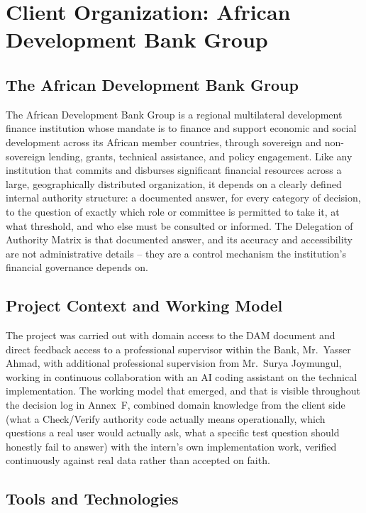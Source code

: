 \chapter{Client Organization: African Development Bank Group}
\label{ch:client}

\section{The African Development Bank Group}

The African Development Bank Group is a regional multilateral development finance institution whose mandate is to finance and support economic and social development across its African member countries, through sovereign and non-sovereign lending, grants, technical assistance, and policy engagement. Like any institution that commits and disburses significant financial resources across a large, geographically distributed organization, it depends on a clearly defined internal authority structure: a documented answer, for every category of decision, to the question of exactly which role or committee is permitted to take it, at what threshold, and who else must be consulted or informed. The Delegation of Authority Matrix is that documented answer, and its accuracy and accessibility are not administrative details -- they are a control mechanism the institution's financial governance depends on.

\section{Project Context and Working Model}

The project was carried out with domain access to the DAM document and direct feedback access to a professional supervisor within the Bank, Mr.~Yasser Ahmad, with additional professional supervision from Mr.~Surya Joymungul, working in continuous collaboration with an AI coding assistant on the technical implementation. The working model that emerged, and that is visible throughout the decision log in Annex~F, combined domain knowledge from the client side (what a Check/Verify authority code actually means operationally, which questions a real user would actually ask, what a specific test question should honestly fail to answer) with the intern's own implementation work, verified continuously against real data rather than accepted on faith.

\section{Tools and Technologies}

